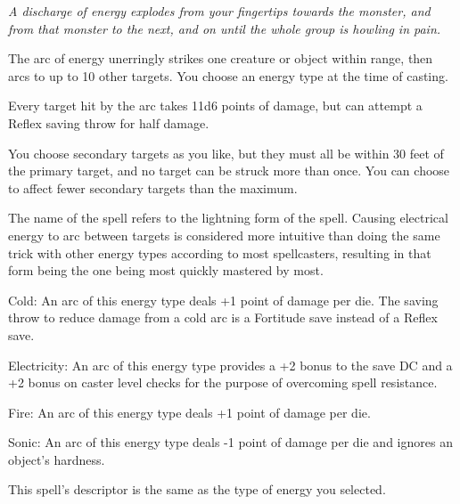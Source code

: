 \emph{A discharge of energy explodes from your fingertips towards the monster, and from that monster to the next, and on until the whole group is howling in pain.}

The arc of energy unerringly strikes one creature or object within range, then arcs to up to 10 other targets.
You choose an energy type at the time of casting.

Every target hit by the arc takes 11d6 points of damage, but can attempt a Reflex saving throw for half damage. 

You choose secondary targets as you like, but they must all be within 30 feet of the primary target, and no target can be struck more than once. 
You can choose to affect fewer secondary targets than the maximum.

The name of the spell refers to the lightning form of the spell.
Causing electrical energy to arc between targets is considered more intuitive than doing the same trick with other energy types according to most spellcasters, resulting in that form being the one being most quickly mastered by most.
\begin{list}{}{\leftmargin=1em}
 \item Cold: An arc of this energy type deals +1 point of damage per die. 
 The saving throw to reduce damage from a cold arc is a Fortitude save instead of a Reflex save.
 \item Electricity: An arc of this energy type provides a +2 bonus to the save DC
 and a +2 bonus on caster level checks for the purpose of overcoming spell resistance.
 \item Fire: An arc of this energy type deals +1 point of damage per die.
 \item Sonic: An arc of this energy type deals -1 point of damage per die and ignores an object's hardness.
\end{list}
This spell's descriptor is the same as the type of energy you selected. 

